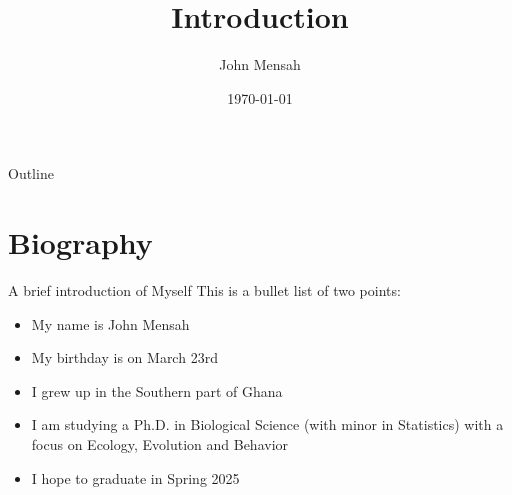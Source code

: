 \documentclass{beamer}\usepackage[]{graphicx}\usepackage[]{color}
\title{Introduction}  %
\author{John Mensah}                              %
\institute{University of Nebraska-Lincoln}                  %
\date{\today}                                    %
\begin{document}
\begin{frame}
\titlepage
\end{frame}

\begin{frame}{Outline}
\tableofcontents
\end{frame}


\section{Biography}

\begin{frame}{A brief introduction of Myself}
This is a bullet list of two points:
  \begin{itemize}
\item My name is John Mensah
\item My birthday is on March 23rd
\item I grew up in the Southern part of Ghana
\item I am studying a Ph.D. in Biological Science (with minor in Statistics) with a focus on Ecology, Evolution and Behavior
\item I hope to graduate in Spring 2025
\end{itemize}
\end{frame}
\end{document}
